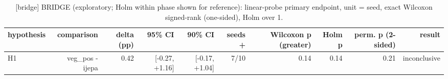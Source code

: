 \begin{table}[t]
\centering
\small
\caption{[bridge] BRIDGE (exploratory; Holm within phase shown for reference): linear-probe primary endpoint, unit = seed, exact Wilcoxon signed-rank (one-sided), Holm over 1.}
\label{tab:primary_comparisons}
\begin{tabular}{lrrrrrrrrr}
\toprule
hypothesis & comparison & delta (pp) & 95\% CI & 90\% CI & seeds + & Wilcoxon p (greater) & Holm p & perm. p (2-sided) & result \\
\midrule
H1 & veg\_pos - ijepa & 0.42 & [-0.27, +1.16] & [-0.17, +1.04] & 7/10 & 0.14 & 0.14 & 0.21 & inconclusive \\
\bottomrule
\end{tabular}
\end{table}
